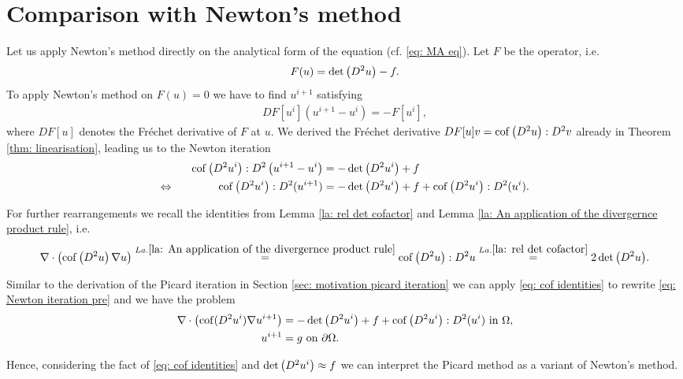 \section{Comparison with Newton's method}

Let us apply Newton's method directly on the analytical form of the \MA equation (cf. \eqref{eq: MA eq}).
Let $F$ be the \MA operator, i.e. 
\[
	F(u) = \det{\left(D^2 u\right)} -f.
\]
To apply Newton's method on $F(u) =0$ we have to find $u^{i+1}$ satisfying
\begin{align}
	DF[u^i](u^{i+1}-u^i) = -F[u^i],
\end{align}
where $DF[u]$ denotes the Fr\'echet derivative of $F$ at $u$. We derived the Fr\'echet derivative $DF[u] v = \operatorname{cof} \left( D^2 u \right):D^2v$ already in Theorem \ref{thm: linearisation}, leading us to the Newton iteration
\begin{align}
	\operatorname{cof} \left( D^2 u^i \right):D^2\left(u^{i+1}-u^i\right) &= -\det{\left(D^2 u^i\right)}+f \nonumber \\
	\Leftrightarrow \qquad \qquad  \operatorname{cof} \left( D^2 u^i \right):D^2(u^{i+1}) &= -\det{\left(D^2 u^i\right)} +f  +\operatorname{cof} \left( D^2 u^i \right):D^2(u^i). \label{eq: Newton iteration pre}
\end{align}

For further rearrangements we recall the identities from Lemma \ref{la: rel det cofactor} and Lemma \ref{la: An application of the divergernce product rule}, i.e. 
\begin{align}
	\nabla \cdot \left( \operatorname{cof} \left( D^2 u  \right) \nabla u \right)
	\stackrel{La.\ref{la: An application of the divergernce product rule}}=\operatorname{cof} \left( D^2 u \right):D^2u
	\stackrel{La.\ref{la: rel det cofactor}}=2 \det{\left(D^2u\right)}. \label{eq: cof identities}
\end{align}

Similar to the derivation of the Picard iteration in Section \ref{sec: motivation picard iteration} we can apply \eqref{eq: cof identities} to rewrite \eqref{eq: Newton iteration pre} and we have the problem
\begin{align}
	\nabla \cdot \left( \operatorname{cof}(D^2 u^i) \nabla u^{i+1} \right) &= -\det{\left(D^2u^i\right)} +f+\operatorname{cof} \left( D^2 u^i \right):D^2(u^i)  \textnormal{ in } \Omega,  \label{eq: Newton iteration}\\
	u^{i+1} &= g \textnormal{ on } \partial \Omega .
\end{align}

Hence, considering the fact of \eqref{eq: cof identities} and $\det{\left(D^2 u^i\right)} \approx f$ we can interpret the Picard method as a variant of Newton's method. 

